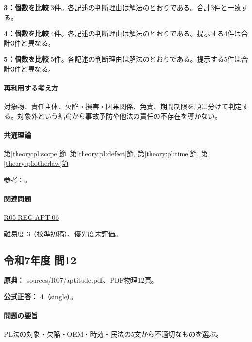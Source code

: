 \noindent\textbf{3：個数を比較} 3件。各記述の判断理由は解法のとおりである。合計3件と一致する。\par

\noindent\textbf{4：個数を比較} 4件。各記述の判断理由は解法のとおりである。提示する4件は合計3件と異なる。\par

\noindent\textbf{5：個数を比較} 5件。各記述の判断理由は解法のとおりである。提示する5件は合計3件と異なる。\par

\paragraph{再利用する考え方} 対象物、責任主体、欠陥・損害・因果関係、免責、期間制限を順に分けて判定する。対象外という結論から事故予防や他法の責任の不存在を導かない。

\paragraph{共通理論} \hyperref[theory:pl:scope]{第\ref*{theory:pl:scope}節}, \hyperref[theory:pl:defect]{第\ref*{theory:pl:defect}節}, \hyperref[theory:pl:time]{第\ref*{theory:pl:time}節}, \hyperref[theory:pl:otherlaw]{第\ref*{theory:pl:otherlaw}節}

\par 参考：\cite{pl_statute,pl_qa,pl_nuclear_statute,pl_transition2020}。

\paragraph{関連問題} \hyperref[q:r05-reg-apt-06]{R05-REG-APT-06}

\par 難易度 3（校準初稿）、優先度未評価。

\subsection{令和7年度 問12}
\label{q:r07-reg-apt-12}

\noindent\textbf{原典：} sources/R07/aptitude.pdf、PDF物理12頁。

\textbf{公式正答：} 4（single）。

\paragraph{問題の要旨} PL法の対象・欠陥・OEM・時効・民法の5文から不適切なものを選ぶ。

